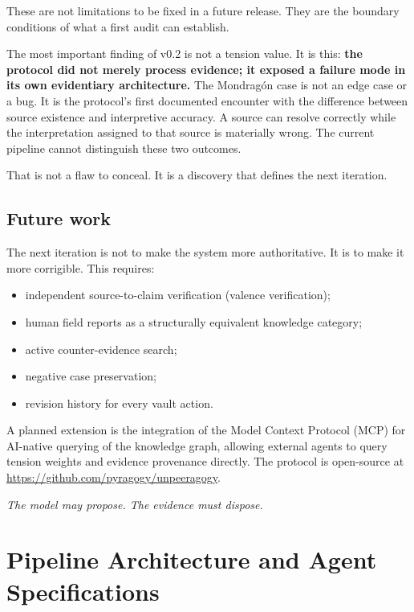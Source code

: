 \documentclass[10pt,twocolumn]{article}
\begin{document}
These are not limitations to be fixed in a future release. They are the boundary conditions of what a first audit can establish.

The most important finding of v0.2 is not a tension value. It is this: \textbf{the protocol did not merely process evidence; it exposed a failure mode in its own evidentiary architecture.} The Mondragón case is not an edge case or a bug. It is the protocol's first documented encounter with the difference between source existence and interpretive accuracy. A source can resolve correctly while the interpretation assigned to that source is materially wrong. The current pipeline cannot distinguish these two outcomes.

That is not a flaw to conceal. It is a discovery that defines the next iteration.

\subsection{Future work}

The next iteration is not to make the system more authoritative. It is to make it more corrigible. This requires:
\begin{itemize}
    \item independent source-to-claim verification (valence verification);
    \item human field reports as a structurally equivalent knowledge category;
    \item active counter-evidence search;
    \item negative case preservation;
    \item revision history for every vault action.
\end{itemize}

A planned extension is the integration of the Model Context Protocol (MCP) for AI-native querying of the knowledge graph, allowing external agents to query tension weights and evidence provenance directly. The protocol is open-source at \url{https://github.com/pyragogy/unpeeragogy}.

\vspace{0.5em}
\noindent\textit{The model may propose. The evidence must dispose.}~\cite{dewey1938logic}

\appendix

\section{Pipeline Architecture and Agent Specifications}
\label{app:pipeline}
\end{document}
